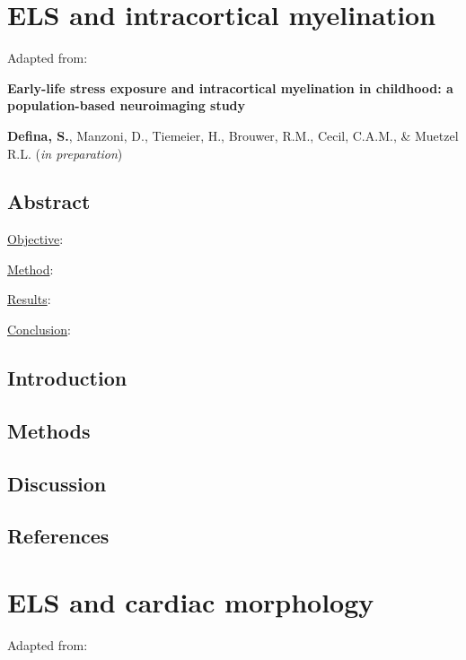 \documentclass[
  letterpaper,
  DIV=11,
  numbers=noendperiod]{scrreport}
\begin{document}
\chapter{ELS and intracortical myelination}\label{sec-chapter4}

Adapted from:

\textbf{Early-life stress exposure and intracortical myelination in
childhood: a population-based neuroimaging study}

\textbf{Defina, S.}, Manzoni, D., Tiemeier, H., Brouwer, R.M., Cecil,
C.A.M., \& Muetzel R.L. (\emph{in preparation})

\section*{Abstract}\label{abstract-2}


\ul{Objective}:

\ul{Method}:

\ul{Results}:

\ul{Conclusion}:

\newpage

\section{Introduction}\label{introduction-2}

\section{Methods}\label{methods-2}

\section{Discussion}\label{discussion-2}

\section*{References}\label{references-3}


\chapter{ELS and cardiac morphology}\label{sec-chapter5}

Adapted from:
\end{document}
